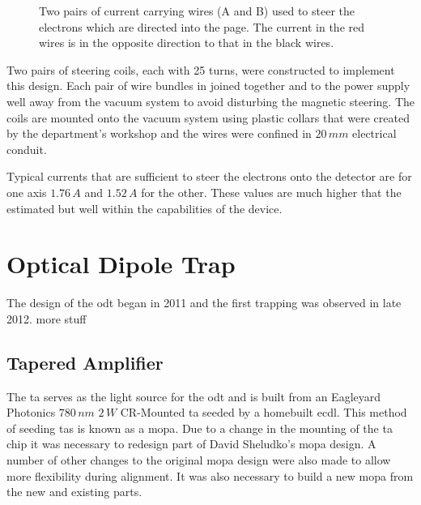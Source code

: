 \begin{figure}[h]
\centering
{}
\caption{Two pairs of current carrying wires (A and B) used to steer the electrons which are directed into the page. The current in the red wires is in the opposite direction to that in the black wires.}
\label{fig:mag_steering}
\end{figure}

Two pairs of steering coils, each with 25 turns, were constructed to implement this design. Each pair of wire bundles in joined together and to the power supply well away from the vacuum system to avoid disturbing the magnetic steering. The coils are mounted onto the vacuum system using plastic collars that were created by the department's workshop and the wires were confined in $20\,\unit{mm}$ electrical conduit.

Typical currents that are sufficient to steer the electrons onto the detector are for one axis $1.76\,\unit{A}$ and $1.52\,\unit{A}$ for the other. These values are much higher that the estimated but well within the capabilities of the device.

\section{Optical Dipole Trap}

The design of the \gls{odt} began in 2011 and the first trapping was observed in late 2012.
{\color{red} more stuff}

\subsection{Tapered Amplifier}
The \gls{ta} serves as the light source for the \gls{odt} and is built from an Eagleyard Photonics $780\,\unit{nm}$ $2\,\unit{W}$ CR-Mounted \gls{ta} seeded by a homebuilt \gls{ecdl}. This method of seeding \glspl{ta} is known as a \gls{mopa}\cite{wilson_narrow-linewidth_1998}. Due to a change in the mounting of the \gls{ta} chip it was necessary to redesign part of David Sheludko's \gls{mopa} design\cite{sheludko_shaped_2010}. A number of other changes to the original \gls{mopa} design were also made to allow more flexibility during alignment. It was also necessary to build a new \gls{mopa} from the new and existing parts.

